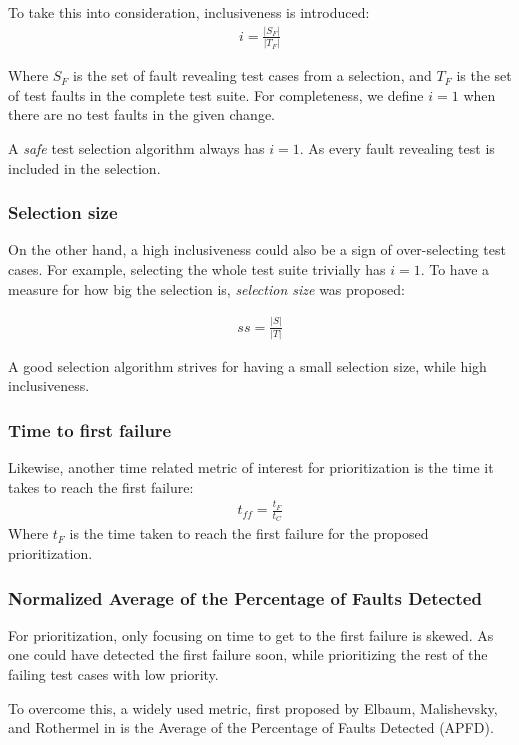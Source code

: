 To take this into consideration, inclusiveness is introduced:
\begin{align*}
i = \frac{|S_F|}{|T_F|}
\end{align*}

Where $S_F$ is the set of fault revealing test cases from a selection, and $T_F$ is the set of test faults in the complete
test suite. For completeness, we define $i=1$ when there are no test faults in the given change.

A \emph{safe} test selection algorithm \cite{366926} always has $i = 1$. As every fault revealing test is included in the selection.

\subsubsection{Selection size}
On the other hand, a high inclusiveness could also be a sign of over-selecting test cases. For example, selecting the whole test
suite trivially has $i=1$. To have a measure for how big the selection is, \emph{selection size} was proposed:

\begin{align*}
    ss = \frac{|S|}{|T|}
\end{align*}

A good selection algorithm strives for having a small selection size, while high inclusiveness.

\subsubsection{Time to first failure}
Likewise, another time related metric of interest for prioritization is the time it takes to reach the first failure:
\begin{align*}
    t_{ff} = \frac{t_F}{t_C}
\end{align*}
Where $t_F$ is the time taken to reach the first failure for the proposed prioritization.

\subsubsection{Normalized Average of the Percentage of Faults Detected}
For prioritization, only focusing on time to get to the first failure is skewed. As one could have detected the first failure
soon, while prioritizing the rest of the failing test cases with low priority.

To overcome this, a widely used metric, first proposed by Elbaum, Malishevsky, and Rothermel in \cite{elbaum2002} is the 
Average of the Percentage of Faults Detected (APFD).

